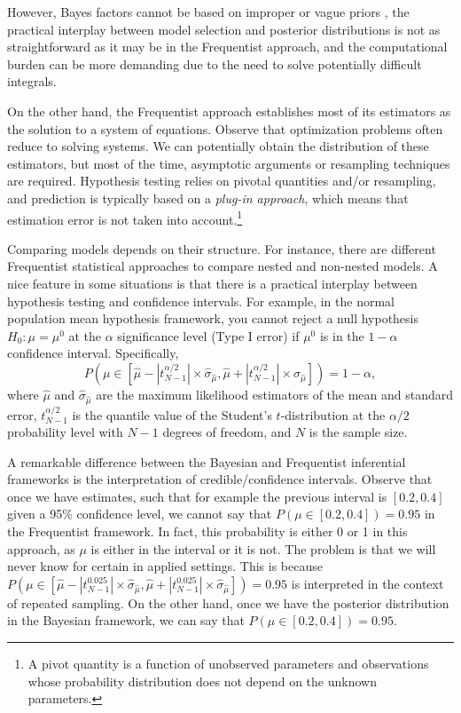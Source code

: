 However, Bayes factors cannot be based on improper or vague priors \cite{koop2003bayesian}, the practical interplay between model selection and posterior distributions is not as straightforward as it may be in the Frequentist approach, and the computational burden can be more demanding due to the need to solve potentially difficult integrals.

On the other hand, the Frequentist approach establishes most of its estimators as the solution to a system of equations. Observe that optimization problems often reduce to solving systems. We can potentially obtain the distribution of these estimators, but most of the time, asymptotic arguments or resampling techniques are required. Hypothesis testing relies on pivotal quantities and/or resampling, and prediction is typically based on a \textit{plug-in approach}, which means that estimation error is not taken into account.\footnote{A pivot quantity is a function of unobserved parameters and observations whose probability distribution does not depend on the unknown parameters.} 

Comparing models depends on their structure. For instance, there are different Frequentist statistical approaches to compare nested and non-nested models. A nice feature in some situations is that there is a practical interplay between hypothesis testing and confidence intervals. For example, in the normal population mean hypothesis framework, you cannot reject a null hypothesis $H_0: \mu = \mu^0$ at the $\alpha$ significance level (Type I error) if $\mu^0$ is in the $1-\alpha$ confidence interval. Specifically, 
\[
P\left( \mu \in \left[\hat{\mu} - |t_{N-1}^{\alpha/2}| \times \hat{\sigma}_{\hat{\mu}}, \hat{\mu} + |t_{N-1}^{\alpha/2}| \times \hat{\sigma}_{\hat{\mu}}\right] \right) = 1 - \alpha,
\]
where $\hat{\mu}$ and $\hat{\sigma}_{\hat{\mu}}$ are the maximum likelihood estimators of the mean and standard error, $t_{N-1}^{\alpha/2}$ is the quantile value of the Student's $t$-distribution at the $\alpha/2$ probability level with $N-1$ degrees of freedom, and $N$ is the sample size.

A remarkable difference between the Bayesian and Frequentist inferential frameworks is the interpretation of credible/confidence intervals. Observe that once we have estimates, such that for example the previous interval is $[0.2, 0.4]$ given a 95\% confidence level, we cannot say that $P(\mu \in [0.2, 0.4]) = 0.95$ in the Frequentist framework. In fact, this probability is either 0 or 1 in this approach, as $\mu$ is either in the interval or it is not. The problem is that we will never know for certain in applied settings. This is because $P(\mu \in [\hat{\mu} - |t_{N-1}^{0.025}| \times \hat{\sigma}_{\hat{\mu}}, \hat{\mu} + |t_{N-1}^{0.025}| \times \hat{\sigma}_{\hat{\mu}}]) = 0.95$ is interpreted in the context of repeated sampling. On the other hand, once we have the posterior distribution in the Bayesian framework, we can say that $P(\mu \in [0.2, 0.4]) = 0.95$.

